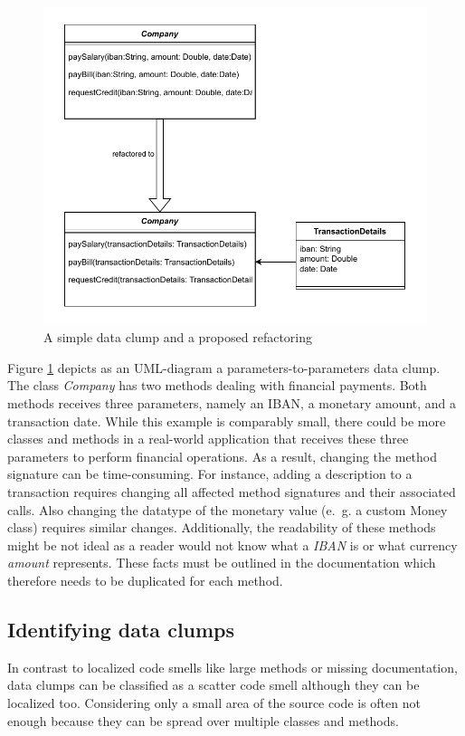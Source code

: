 \begin{figure}
    \centering
    \includegraphics[scale=0.9]{figures/chapter2/dataClump/refactor_simple_case.pdf}
    \caption{A simple data clump and a proposed refactoring}
    \label{fig:company_bill_tax}
\end{figure}
Figure \ref{fig:company_bill_tax} depicts as an UML-diagram a parameters-to-parameters data clump. The class \textit{Company} has two methods dealing with financial payments. Both methods  receives three parameters, namely an IBAN, a monetary amount, and a transaction date. While this example is comparably small, there could be more classes and methods in a real-world application that receives these three parameters to perform financial operations. As a result, changing the method signature can be time-consuming. For instance, adding a description to a transaction requires changing all affected method signatures and their associated calls. Also changing the datatype of the monetary value (e.~g. a custom Money class) requires similar changes. Additionally, the readability of these methods might be not ideal as a reader would not know what a \textit{IBAN} is or what currency \textit{amount} represents. These facts must be outlined in the documentation which therefore needs to be duplicated for each method. 
 
\subsection{Identifying data clumps}\label{sec:data_clump_detection}
In contrast to localized code smells like large methods or missing documentation, data clumps can be classified as a scatter code smell although they can be localized too. Considering only a small area of the source code is often not enough because they can be spread over multiple classes and methods. 

